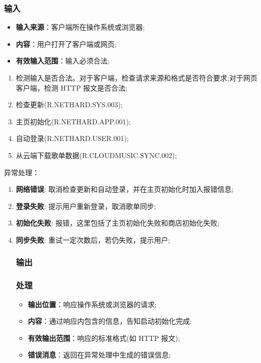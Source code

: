 \subsubsection{输入}
	\begin{itemize}
		\item \textbf{输入来源}：客户端所在操作系统或浏览器;
		\item \textbf{内容}：用户打开了客户端或网页;
		\item \textbf{有效输入范围}：输入必须合法;
	\end{itemize}
\begin{enumerate}
\item 检测输入是否合法。对于客户端，检查请求来源和格式是否符合要求;对于网页客户端，检测 HTTP 报文是否合法;
\item 检查更新(R.NETHARD.SYS.003);
\item 主页初始化(R.NETHARD.APP.001);
\item 自动登录(R.NETHARD.USER.001);
\item 从云端下载歌单数据(R.CLOUDMUSIC.SYNC.002);
\end{enumerate}
\noindent 异常处理：
\begin{enumerate}
\item \textbf{网络错误}: 取消检查更新和自动登录，并在主页初始化时加入报错信息;
\item \textbf{登录失败}: 提示用户重新登录，取消歌单同步;
\item \textbf{初始化失败}: 报错，这里包括了主页初始化失败和商店初始化失败;
  \item \textbf{同步失败}: 重试一定次数后，若仍失败，提示用户;
\subsubsection{输出}
\subsubsection{处理}
\begin{itemize}
	\item \textbf{输出位置}：响应操作系统或浏览器的请求;
	\item \textbf{内容}：通过响应内包含的信息，告知启动初始化完成;
	\item \textbf{有效输出范围}：响应的标准格式(如 HTTP 报文);
	\item \textbf{错误消息}：返回在异常处理中生成的错误信息;
\end{itemize}
\end{enumerate}

